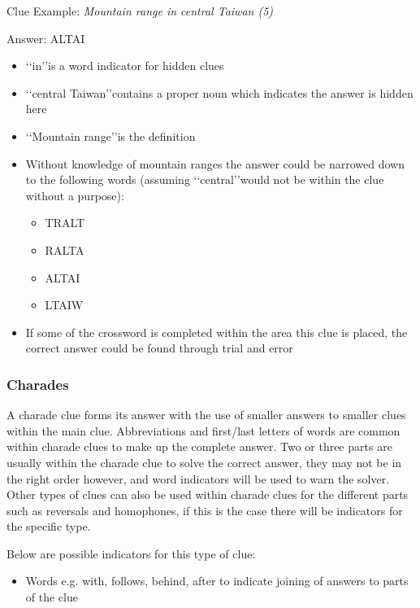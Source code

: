 Clue Example: \emph{Mountain range in central Taiwan (5)}

Answer: ALTAI 

\begin{itemize}
	\item \lq\lq in\rq\rq is a word indicator for hidden clues 
	\item \lq\lq central Taiwan\rq\rq contains a proper noun which indicates the answer is hidden here 
 	\item \lq\lq Mountain range\rq\rq is the definition 
 	\item Without knowledge of mountain ranges the answer could be narrowed down to the following words (assuming \lq\lq central\rq\rq would not be within the clue without a purpose): 
	\begin{itemize}
		\item TRALT 
		\item RALTA 
		\item ALTAI 
		\item LTAIW
	\end{itemize} 
\item If some of the crossword is completed within the area this clue is placed, the correct answer could be found through trial and error 
\end{itemize}

\subsubsection{Charades}

A charade clue forms its answer with the use of smaller answers to smaller clues within the main clue. Abbreviations and first/last letters of words are common within charade clues to make up the complete answer. Two or three parts are usually within the charade clue to solve the correct answer, they may not be in the right order however, and word indicators will be used to warn the solver. Other types of clues can also be used within charade clues for the different parts such as reversals and homophones, if this is the case there will be indicators for the specific type.  

Below are possible indicators for this type of clue: 
\begin{itemize}
	\item Words e.g. with, follows, behind, after to indicate joining of answers to parts of the clue 
\\
\end{itemize}

